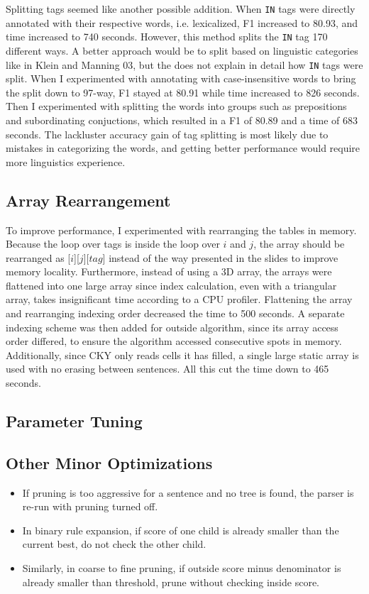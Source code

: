 \documentclass[11pt]{article}
\begin{document}
Splitting tags seemed like another possible addition. When \texttt{IN} tags were directly
annotated with their respective words, i.e. lexicalized, F1 increased to 80.93, and time increased to
740 seconds. However, this method splits the \texttt{IN} tag 170 different ways. A better approach
would be to split based on linguistic categories like in Klein and Manning 03,
but the does not explain in detail how \texttt{IN} tags were split. When I experimented with
annotating with case-insensitive words to bring the split down to 97-way, F1 stayed at 80.91
while time increased to 826 seconds. Then I experimented with splitting the words into groups
such as prepositions and subordinating conjuctions, which resulted in a F1 of 80.89 and a time of
683 seconds. The lackluster accuracy gain of tag splitting is most likely due to mistakes in
categorizing the words, and getting better performance would require more linguistics experience.

\subsection{Array Rearrangement}
To improve performance, I experimented with rearranging the tables in memory. Because the loop over
tags is inside the loop over $i$ and $j$, the array should be rearranged as [$i$][$j$][$tag$] instead
of the way presented in the slides to improve memory locality. Furthermore, instead of using a
3D array, the arrays were flattened into one large array since index calculation,
even with a triangular array, takes insignificant time according to a CPU profiler. Flattening the
array and rearranging indexing order decreased the time to 500 seconds. A separate indexing scheme
was then added for outside algorithm, since its array access order differed, to ensure the algorithm
accessed consecutive spots in memory. Additionally, since CKY only reads cells it has filled,
a single large static array is used with no erasing between sentences. All this cut the time down
to 465 seconds.

\subsection{Parameter Tuning}

\subsection{Other Minor Optimizations}
\begin{itemize}
\item If pruning is too aggressive for a sentence and no tree is found,
the parser is re-run with pruning turned off.
\item In binary rule expansion, if score of one child is already smaller than the current best,
do not check the other child.
\item Similarly, in coarse to fine pruning, if outside score minus denominator is already smaller
than threshold, prune without checking inside score.
\end{itemize}
\end{document}
